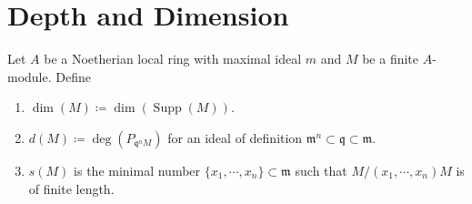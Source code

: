 \documentclass[leqno]{amsart}
\DeclareMathOperator{\Supp}{Supp}
\newcommand{\1}{\mathbf{1}}
\newcommand{\fm}{\mathfrak m}
\newcommand{\fq}{\mathfrak q}
\theoremstyle{definition}
\theoremstyle{remark}
\begin{document}
\section{Depth and Dimension}

Let $A$ be a Noetherian local ring with maximal ideal $m$
and  $M$ be a finite $A$-module. Define
\begin{enumerate}[label=(\alph*)]
	\item 
		$\dim (M)\coloneqq \dim (\Supp(M))$.
	\item 
		$d(M)\coloneqq \deg(P_{\fq^nM})$ for an ideal of definition
		$\fm^n\subset \fq\subset \fm$.
	\item 
		$s(M)$ is the minimal number 
		$\{x_1,\cdots ,x_n\}\subset \fm$ such that 
		$M/(x_1,\cdots,x_n)M$ is of finite length.
\end{enumerate}
\end{document}

